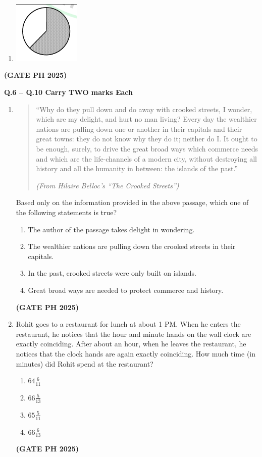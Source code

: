 \documentclass[14pt, a4paper]{extarticle}
\begin{document}
\begin{enumerate}[label=\textbf{Q.\arabic*}]
\begin{enumerate}
\item \includegraphics[width=0.25\textwidth]{figs/q3figd25.png}
\end{enumerate}
\hfill \textbf{(GATE PH 2025)}

\end{enumerate}

\textbf{Q.6 – Q.10 Carry TWO marks Each}

\begin{enumerate}[label=\textbf{Q.\arabic*}]

\item
\begin{quote}
“Why do they pull down and do away with crooked streets, I wonder, which are my delight, and hurt no man living? Every day the wealthier nations are pulling down one or another in their capitals and their great towns: they do not know why they do it; neither do I. It ought to be enough, surely, to drive the great broad ways which commerce needs and which are the life-channels of a modern city, without destroying all history and all the humanity in between: the islands of the past.”
\par\raggedleft\textit{(From Hilaire Belloc's “The Crooked Streets”)}
\end{quote}
Based only on the information provided in the above passage, which one of the following statements is true?
\begin{enumerate}
\item The author of the passage takes delight in wondering.
\item The wealthier nations are pulling down the crooked streets in their capitals.
\item In the past, crooked streets were only built on islands.
\item Great broad ways are needed to protect commerce and history.
\end{enumerate}
\hfill \textbf{(GATE PH 2025)}

\item Rohit goes to a restaurant for lunch at about 1 PM. When he enters the restaurant, he notices that the hour and minute hands on the wall clock are exactly coinciding. After about an hour, when he leaves the restaurant, he notices that the clock hands are again exactly coinciding. How much time (in minutes) did Rohit spend at the restaurant?
\begin{enumerate}
\item $64\frac{6}{11}$
\item $66\frac{5}{13}$
\item $65\frac{5}{11}$
\item $66\frac{6}{13}$
\end{enumerate}
\hfill \textbf{(GATE PH 2025)}


\end{enumerate}
\end{document}
